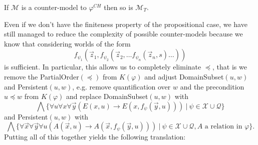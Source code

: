 \documentclass[runningheads]{llncs}
\begin{document}
\begin{lemma}
	If $\mathcal M$ is a counter-model to $\varphi^{CH}$ then so is $\mathcal M_T$.
\end{lemma}

Even if we don't have the finiteness property of the propositional case, we have still managed to reduce the complexity of possible counter-models because we know that considering worlds of the form $$f_{\psi_1}(\vec z_1, f_{\psi_2}(\vec z_2, \dots f_{\psi_n}(\vec z_n, s)\dots))$$ is sufficient.
In particular, this allows us to completely eliminate $\preceq$, that is we remove the PartialOrder$(\preceq)$
from $K(\varphi)$ and adjust DomainSubset$(u, w)$ and Persistent$(u, w)$, e.g. remove quantification over $w$ and the precondition $u\preceq w$ from $K(\varphi)$ and replace DomainSubset$(u, w)$ with
$$
	\bigwedge\{\forall u\forall x\forall\vec y(E(x, u)\to E(x, f_\psi(\vec y, u)))\:|\:\psi\in\mathcal X\cup\mathcal Q\}
$$
and Persistent$(u, w)$ with
$$
	\bigwedge\{\forall\vec x\forall\vec y\forall u(A(\vec x, u)\to A(\vec x, f_\psi(\vec y, u)))\:|\:\psi\in\mathcal X\cup\mathcal Q, \text{$A$ a relation in $\varphi$}\}.
$$Putting all of this together yields the following translation:
\end{document}
